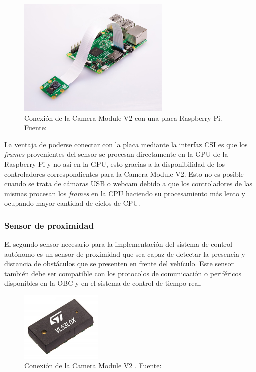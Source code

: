         \begin{figure}[!h] 
            \centering
            \includegraphics[width=0.65\textwidth]{img/raspicamconn}
            \caption[Conexión de la Camera Module V2]{Conexión de la Camera Module V2 con una placa Raspberry Pi. Fuente: \cite{raspicam} }
            \label{fig:raspicamconn}
        \end{figure}

        La ventaja de poderse conectar con la placa mediante la interfaz CSI es que los \textit{frames} provenientes del sensor 
        se procesan directamente en la GPU de la Raspberry Pi y no así en la GPU, esto gracias a la disponibilidad de los 
        controladores correspondientes para la Camera Module V2. Esto no es posible cuando se trata de cámaras USB o webcam 
        debido a que los controladores de las mismas procesan los \textit{frames} en la CPU haciendo su procesamiento más lento 
        y ocupando mayor cantidad de ciclos de CPU.

        \subsubsection{Sensor de proximidad}\label{sec:laser}
        El segundo sensor necesario para la implementación del sistema de control autónomo es un sensor de proximidad que 
        sea capaz de detectar la presencia y distancia de obstáculos que se presenten en frente del vehículo. Este sensor 
        también debe ser compatible con los protocolos de comunicación o periféricos disponibles en la OBC y en el sistema 
        de control de tiempo real.

        \begin{figure}[!h] 
            \centering
            \includegraphics[width=0.35\textwidth]{img/laser}
            \caption[Sensor VL53L0X de ST Microelectronics]{Conexión de la Camera Module V2 . Fuente: \cite{laser} }
            \label{fig:laser}
        \end{figure}

